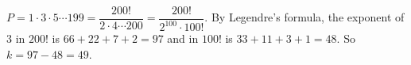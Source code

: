 \(P=1\cdot 3\cdot 5\cdots 199=\dfrac{200!}{2\cdot 4\cdots 200}=\dfrac{200!}{2^{100}\cdot 100!}\). By Legendre's formula, the exponent of \(3\) in \(200!\) is \(66+22+7+2=97\) and in \(100!\) is \(33+11+3+1=48\). So \(k=97-48=\boxed{49}\).
